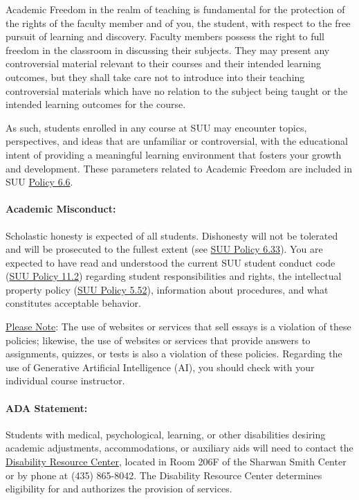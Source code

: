 \documentclass[12pt, letterpaper]{article}
\begin{document}
\noindent
Academic Freedom in the realm of teaching is fundamental for the protection of the rights of the faculty member and of you, the student, with respect to the free pursuit of learning and discovery. Faculty members possess the right to full freedom in the classroom in discussing their subjects. They may present any controversial material relevant to their courses and their intended learning outcomes, but they shall take care not to introduce into their teaching controversial materials which have no relation to the subject being taught or the intended learning outcomes for the course.

\noindent
As such, students enrolled in any course at SUU may encounter topics, perspectives, and ideas that are unfamiliar or controversial, with the educational intent of providing a meaningful learning environment that fosters your growth and development. These parameters related to Academic Freedom are included in SUU \href{https://www.suu.edu/policies/06/06.html}{Policy 6.6}.

\paragraph{Academic Misconduct:}
Scholastic honesty is expected of all students. Dishonesty will not be tolerated and will be prosecuted to the fullest extent (see \href{https://www.suu.edu/policies/06/33.html}{SUU Policy 6.33}). You are expected to have read and understood the current SUU student conduct code (\href{https://www.suu.edu/policies/11/02.html}{SUU Policy 11.2}) regarding student responsibilities and rights, the intellectual property policy (\href{https://www.suu.edu/policies/05/52.html}{SUU Policy 5.52}), information about procedures, and what constitutes acceptable behavior. 

\noindent
\underline{Please Note}: The use of websites or services that sell essays is a violation of these policies; likewise, the use of websites or services that provide answers to assignments, quizzes, or tests is also a violation of these policies. Regarding the use of Generative Artificial Intelligence (AI), you should check with your individual course instructor.

\paragraph{ADA Statement:}
Students with medical, psychological, learning, or other disabilities desiring academic adjustments, accommodations, or auxiliary aids will need to contact the \href{https://www.suu.edu/disabilityservices/}{Disability Resource Center}, located in Room 206F of the Sharwan Smith Center or by phone at (435) 865-8042. The Disability Resource Center determines eligibility for and authorizes the provision of services.
\end{document}

